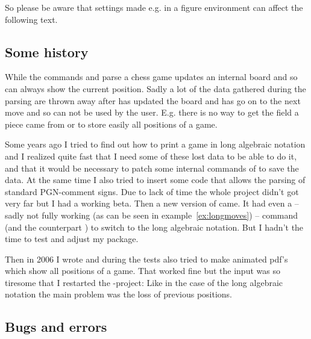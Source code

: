 \documentclass[pagesize,parskip=half-,fontsize=12pt]{scrartcl}
\begin{document}
So please be aware that settings made e.g. in a figure environment
can affect the following text.


\subsection{Some history}

While the commands  and  parse a chess
game \skaksty updates an internal board and so can always show the
current position. Sadly a lot of the data gathered during the
parsing are thrown away after  has updated the
board and  has go on to the next move and so can not be used by the
user. E.g. there is no way to get the field a piece came from or to
store easily all positions of a game.

Some years ago I tried to find out how to print a game in long
algebraic notation and I realized quite fast that I need some of
these lost data to be able to do it, and that it would be necessary
to patch some internal commands of \skaksty to save the data. At the
same time I also tried to insert some code that allows the parsing of
standard PGN-comment signs. Due to lack of time the whole project
didn't got very far but I had a working beta. Then a new version of
\skaksty came. It had even a -- sadly not fully working (as can be
seen in example~\ref{ex:longmoves}) -- command %
(and the counterpart ) to switch to the long algebraic
notation. But I hadn't the time to test and adjust my package.





Then in 2006 I wrote \pchessboard and during the tests also tried to
make animated pdf's which show all positions of a game. That worked
fine but the input was so tiresome that I restarted the
-project: Like in the case of the long algebraic
notation the main problem was the loss of previous positions.


\subsection{Bugs and errors}
\end{document}
